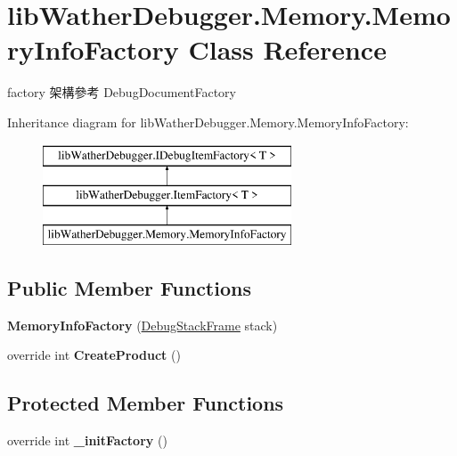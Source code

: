 \hypertarget{classlib_wather_debugger_1_1_memory_1_1_memory_info_factory}{\section{lib\+Wather\+Debugger.\+Memory.\+Memory\+Info\+Factory Class Reference}
\label{classlib_wather_debugger_1_1_memory_1_1_memory_info_factory}
}


factory 架構參考 Debug\+Document\+Factory  


Inheritance diagram for lib\+Wather\+Debugger.\+Memory.\+Memory\+Info\+Factory\+:\begin{figure}[H]
\begin{center}
\leavevmode
\includegraphics[height=3.000000cm]{classlib_wather_debugger_1_1_memory_1_1_memory_info_factory}
\end{center}
\end{figure}
\subsection*{Public Member Functions}
\begin{DoxyCompactItemize}
\item 
\hypertarget{classlib_wather_debugger_1_1_memory_1_1_memory_info_factory_a33043b35c9149907533a23087cfed482}{{\bfseries Memory\+Info\+Factory} (\hyperlink{classlib_wather_debugger_1_1_stack_1_1_debug_stack_frame}{Debug\+Stack\+Frame} stack)}\label{classlib_wather_debugger_1_1_memory_1_1_memory_info_factory_a33043b35c9149907533a23087cfed482}

\item 
\hypertarget{classlib_wather_debugger_1_1_memory_1_1_memory_info_factory_a153ff776471fd6cf8b429862294b8842}{override int {\bfseries Create\+Product} ()}\label{classlib_wather_debugger_1_1_memory_1_1_memory_info_factory_a153ff776471fd6cf8b429862294b8842}

\end{DoxyCompactItemize}
\subsection*{Protected Member Functions}
\begin{DoxyCompactItemize}
\item 
\hypertarget{classlib_wather_debugger_1_1_memory_1_1_memory_info_factory_a580ac7ba7c1d6978ce2342250103653e}{override int {\bfseries \+\_\+init\+Factory} ()}\label{classlib_wather_debugger_1_1_memory_1_1_memory_info_factory_a580ac7ba7c1d6978ce2342250103653e}

\end{DoxyCompactItemize}
